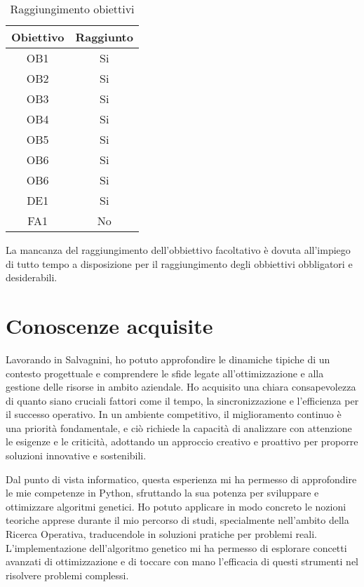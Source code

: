 \begin{table}[H]
    \centering
    \begin{tabular}{|c|c|}
    \hline
    \textbf{Obiettivo} & \textbf{Raggiunto} \\ \hline
    OB1 & Si \\ \hline
    OB2 & Si \\ \hline
    OB3 & Si \\ \hline
    OB4 & Si \\ \hline
    OB5 & Si \\ \hline
    OB6 & Si \\ \hline
    OB6 & Si \\ \hline
    DE1 & Si \\ \hline
    FA1 & No \\ \hline
    \end{tabular}
    \caption{Raggiungimento obiettivi}
\end{table}

La mancanza del raggiungimento dell'obbiettivo facoltativo è dovuta all'impiego di tutto tempo a disposizione per il raggiungimento degli obbiettivi obbligatori e desiderabili.

\section{Conoscenze acquisite}

Lavorando in Salvagnini, ho potuto approfondire le dinamiche tipiche di un contesto progettuale e comprendere le sfide legate all'ottimizzazione e alla gestione delle risorse in ambito aziendale. Ho acquisito una chiara consapevolezza di quanto siano cruciali fattori come il tempo, la sincronizzazione e l'efficienza per il successo operativo. In un ambiente competitivo, il miglioramento continuo è una priorità fondamentale, e ciò richiede la capacità di analizzare con attenzione le esigenze e le criticità, adottando un approccio creativo e proattivo per proporre soluzioni innovative e sostenibili.

Dal punto di vista informatico, questa esperienza mi ha permesso di approfondire le mie competenze in Python, sfruttando la sua potenza per sviluppare e ottimizzare algoritmi genetici. Ho potuto applicare in modo concreto le nozioni teoriche apprese durante il mio percorso di studi, specialmente nell'ambito della Ricerca Operativa, traducendole in soluzioni pratiche per problemi reali. L'implementazione dell'algoritmo genetico mi ha permesso di esplorare concetti avanzati di ottimizzazione e di toccare con mano l’efficacia di questi strumenti nel risolvere problemi complessi.


